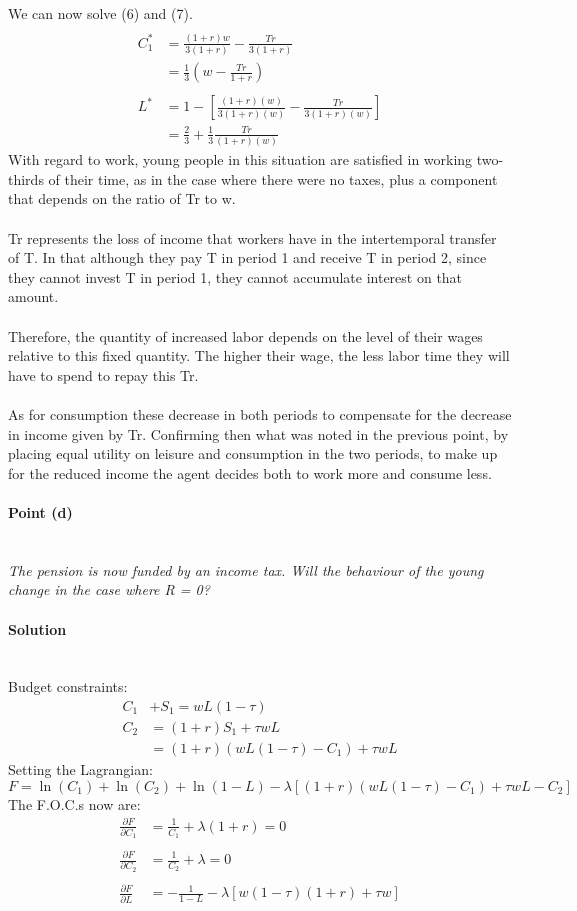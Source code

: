 \documentclass[12pt]{article}
\newcommand{\myparagraph}[1]{\paragraph{#1}\mbox{}\\}
\begin{document}
We can now solve (6) and (7).
\begin{align*}
\\
C_1^{*} &= \frac{(1 + r)w}{3(1+ r)} - \frac{Tr}{3(1 + r)}\\
&= \frac{1}{3}(w - \frac{Tr}{1 + r})\\\\
L^{*} &= 1 - \left[ \frac{(1 + r)(w)}{3(1 + r)(w)} - \frac{Tr}{3(1 + r)(w)} \right] \\
&= \frac{2}{3} + \frac{1}{3} \frac{Tr}{(1 + r)(w)}
\end{align*}
With regard to work, young people in this situation are satisfied in working two-thirds of their time, as in the case where there were no taxes, plus a component that depends on the ratio of Tr to w.\\ \\
Tr represents the loss of income that workers have in the intertemporal transfer of T. In that although they pay T in period 1 and receive T in period 2, since they cannot invest T in period 1, they cannot accumulate interest on that amount. \\\\
Therefore, the quantity of increased labor depends on the level of their wages relative to this fixed quantity. The higher their wage, the less labor time they will have to spend to repay this Tr. \\\\
As for consumption these decrease in both periods to compensate for the decrease in income given by Tr. Confirming then what was noted in the previous point, by placing equal utility on leisure and consumption in the two periods, to make up for the reduced income the agent decides both to work more and consume less. 
\myparagraph{Point (d)}
\textit{The pension is now funded by an income tax. Will the behaviour of the young change in the case where R = 0?}
\myparagraph{Solution}
Budget constraints:
\begin{align*}
C_1& + S_1 = wL(1 - \tau)\\
C_2& = (1 + r)S_1 + \tau wL\\
&= (1 + r)(wL(1 - \tau) - C_1) + \tau wL
\end{align*}
Setting the Lagrangian: 
\begin{equation*}
F = \ln(C_1) + \ln(C_2) + \ln(1-L) - \lambda[(1+r)(wL(1 - \tau) - C_1) + \tau wL - C_2]
\end{equation*}
The F.O.C.s now are: 
\begin{align*}
\frac{\partial F}{\partial C_1} &= \frac{1}{C_1} + \lambda(1+r) = 0 \\\\
\frac{\partial F}{\partial C_2} &= \frac{1}{C_2} + \lambda = 0\\\\
\frac{\partial F}{\partial L}  &= - \frac{1}{1 - L} - \lambda[w(1-\tau)(1+r) + \tau w]
\end{align*}
\end{document}
